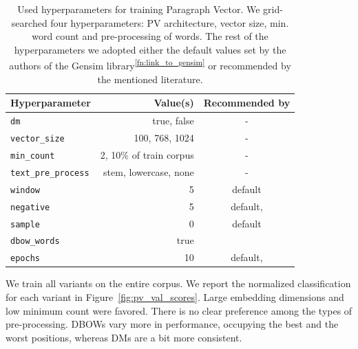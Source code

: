 \begin{table}
  \footnotesize
  \centering
  \begin{tabular}{lrc}
    \toprule
    Hyperparameter & Value(s) & Recommended by \\
    \midrule
    \texttt{dm} & true, false & - \\
    \texttt{vector\_size} & 100, 768, 1024 & - \\
    \texttt{min\_count} & 2, 10\% of train corpus & - \\
    \texttt{text\_pre\_process} & stem, lowercase, none & - \\
    \texttt{window} & 5 & default \\
    \texttt{negative} & 5 & default, \cite{lau2016empirical} \\
    \texttt{sample} & 0 & default \\
    \texttt{dbow\_words} & true & \cite{lau2016empirical} \\
    \texttt{epochs} & 10 & default, \cite{dai2015document} \\
    \bottomrule
  \end{tabular}

  \caption{Used hyperparameters for training Paragraph Vector. We grid-searched
  four hyperparameters: PV architecture, vector size, min. word count and
  pre-processing of words. The rest of the hyperparameters we adopted either the
  default values set by the authors of the Gensim
  library\textsuperscript{\ref{fn:link_to_gensim}} or recommended by the
  mentioned literature.}

  \label{table:pv_hyperparams}

\end{table}

We train all variants on the entire  corpus. We report the
normalized classification for each variant in Figure~\ref{fig:pv_val_scores}.
Large embedding dimensions and low minimum count were favored. There is no clear
preference among the types of pre-processing. DBOWs vary more in performance,
occupying the best and the worst positions, whereas DMs are a bit more
consistent.

